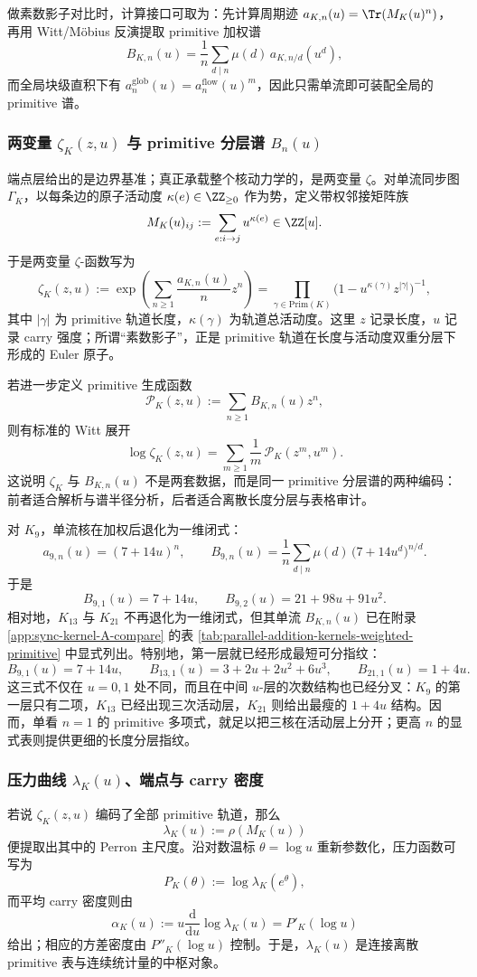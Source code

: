 做素数影子对比时，计算接口可取为：先计算周期迹 \(a_{K,n}(u)=\Tr(M_K(u)^n)\)，再用 Witt/M\"obius 反演提取 primitive 加权谱
\[
B_{K,n}(u)=\frac{1}{n}\sum_{d\mid n}\mu(d)\,a_{K,n/d}(u^d),
\]
而全局块级直积下有 \(a_n^{\mathrm{glob}}(u)=a_n^{\mathrm{flow}}(u)^m\)，因此只需单流即可装配全局的 primitive 谱。

\subsubsection{两变量 \texorpdfstring{$\zeta_K(z,u)$}{zeta(z,u)} 与 primitive 分层谱 \texorpdfstring{$B_n(u)$}{B\_n(u)}}
端点层给出的是边界基准；真正承载整个核动力学的，是两变量 \(\zeta\)。对单流同步图 \(\Gamma_K\)，以每条边的原子活动度 \(\kappa(e)\in\ZZ_{\ge 0}\) 作为势，定义带权邻接矩阵族
\[
M_K(u)_{ij}:=\sum_{e:i\to j}u^{\kappa(e)}\in\ZZ[u].
\]
于是两变量 \(\zeta\)-函数写为
\[
\zeta_K(z,u)
:=\exp\!\left(\sum_{n\ge 1}\frac{a_{K,n}(u)}{n}z^n\right)
=\prod_{\gamma\in\mathrm{Prim}(K)}
\bigl(1-u^{\kappa(\gamma)}z^{|\gamma|}\bigr)^{-1},
\]
其中 \(|\gamma|\) 为 primitive 轨道长度，\(\kappa(\gamma)\) 为轨道总活动度。这里 \(z\) 记录长度，\(u\) 记录 carry 强度；所谓“素数影子”，正是 primitive 轨道在长度与活动度双重分层下形成的 Euler 原子。

若进一步定义 primitive 生成函数
\[
\mathcal P_K(z,u):=\sum_{n\ge 1}B_{K,n}(u)z^n,
\]
则有标准的 Witt 展开
\[
\log \zeta_K(z,u)
=\sum_{m\ge 1}\frac{1}{m}\,\mathcal P_K(z^m,u^m).
\]
这说明 \(\zeta_K\) 与 \(B_{K,n}(u)\) 不是两套数据，而是同一 primitive 分层谱的两种编码：前者适合解析与谱半径分析，后者适合离散长度分层与表格审计。

对 \(K_9\)，单流核在加权后退化为一维闭式：
\[
a_{9,n}(u)=(7+14u)^n,
\qquad
B_{9,n}(u)=\frac{1}{n}\sum_{d\mid n}\mu(d)\,\bigl(7+14u^d\bigr)^{n/d}.
\]
于是
\[
B_{9,1}(u)=7+14u,
\qquad
B_{9,2}(u)=21+98u+91u^2.
\]
相对地，\(K_{13}\) 与 \(K_{21}\) 不再退化为一维闭式，但其单流 \(B_{K,n}(u)\) 已在附录 \ref{app:sync-kernel-A-compare} 的表 \ref{tab:parallel-addition-kernels-weighted-primitive} 中显式列出。特别地，第一层就已经形成最短可分指纹：
\[
B_{9,1}(u)=7+14u,\qquad
B_{13,1}(u)=3+2u+2u^2+6u^3,\qquad
B_{21,1}(u)=1+4u.
\]
这三式不仅在 \(u=0,1\) 处不同，而且在中间 \(u\)-层的次数结构也已经分叉：\(K_9\) 的第一层只有二项，\(K_{13}\) 已经出现三次活动层，\(K_{21}\) 则给出最瘦的 \(1+4u\) 结构。因而，单看 \(n=1\) 的 primitive 多项式，就足以把三核在活动层上分开；更高 \(n\) 的显式表则提供更细的长度分层指纹。

\subsubsection{压力曲线 \texorpdfstring{$\lambda_K(u)$}{lambda(u)}、端点与 carry 密度}\label{subsec:kernel-pressure-curve}
若说 \(\zeta_K(z,u)\) 编码了全部 primitive 轨道，那么
\[
\lambda_K(u):=\rho(M_K(u))
\]
便提取出其中的 Perron 主尺度。沿对数温标 \(\theta=\log u\) 重新参数化，压力函数可写为
\[
P_K(\theta):=\log \lambda_K(e^\theta),
\]
而平均 carry 密度则由
\[
\alpha_K(u):=u\frac{\mathrm{d}}{\mathrm{d}u}\log\lambda_K(u)=P'_K(\log u)
\]
给出；相应的方差密度由 \(P''_K(\log u)\) 控制。于是，\(\lambda_K(u)\) 是连接离散 primitive 表与连续统计量的中枢对象。

